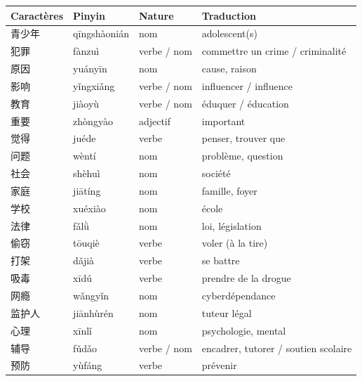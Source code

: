 \documentclass[11pt]{article}
\begin{document}
\begin{center}
\begin{tabularx}{\linewidth}{|X|X|X|X|}
\hline
\rowcolor{popblueL} \textbf{Caractères} & \textbf{Pinyin} & \textbf{Nature} & \textbf{Traduction} \\ \hline
青少年 & qīngshàonián & nom & adolescent(s) \\ \hline
犯罪 & fànzuì & verbe / nom & commettre un crime / criminalité \\ \hline
原因 & yuányīn & nom & cause, raison \\ \hline
影响 & yǐngxiǎng & verbe / nom & influencer / influence \\ \hline
教育 & jiàoyù & verbe / nom & éduquer / éducation \\ \hline
重要 & zhòngyào & adjectif & important \\ \hline
觉得 & juéde & verbe & penser, trouver que \\ \hline
问题 & wèntí & nom & problème, question \\ \hline
社会 & shèhuì & nom & société \\ \hline
家庭 & jiātíng & nom & famille, foyer \\ \hline
学校 & xuéxiào & nom & école \\ \hline
法律 & fǎlǜ & nom & loi, législation \\ \hline
偷窃 & tōuqiè & verbe & voler (à la tire) \\ \hline
打架 & dǎjià & verbe & se battre \\ \hline
吸毒 & xīdú & verbe & prendre de la drogue \\ \hline
网瘾 & wǎngyǐn & nom & cyberdépendance \\ \hline
监护人 & jiānhùrén & nom & tuteur légal \\ \hline
心理 & xīnlǐ & nom & psychologie, mental \\ \hline
辅导 & fǔdǎo & verbe / nom & encadrer, tutorer / soutien scolaire \\ \hline
预防 & yùfáng & verbe & prévenir \\ \hline
\end{tabularx}
\end{center}
\end{document}
